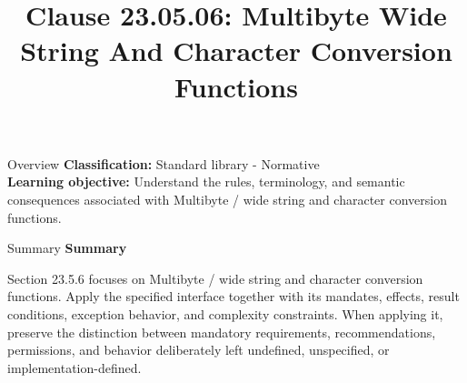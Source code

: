 \documentclass[10pt,letterpaper]{article}
\title{Clause 23.05.06: Multibyte Wide String And Character Conversion Functions}
\author{}
\date{}
\begin{document}
\maketitle
\begin{CornellOverviewBox}{Overview}
\textbf{Classification:} Standard library - Normative\\[2pt]
\textbf{Learning objective:} Understand the rules, terminology, and semantic consequences associated with Multibyte / wide string and character conversion functions.
\end{CornellOverviewBox}\begin{CornellSummaryBox}{Summary}
{\sffamily\bfseries\color{Accent} Summary}\par\vspace{3pt}Section 23.5.6 focuses on Multibyte / wide string and character conversion functions. Apply the specified interface together with its mandates, effects, result conditions, exception behavior, and complexity constraints. When applying it, preserve the distinction between mandatory requirements, recommendations, permissions, and behavior deliberately left undefined, unspecified, or implementation-defined.
\end{CornellSummaryBox}
\end{document}
